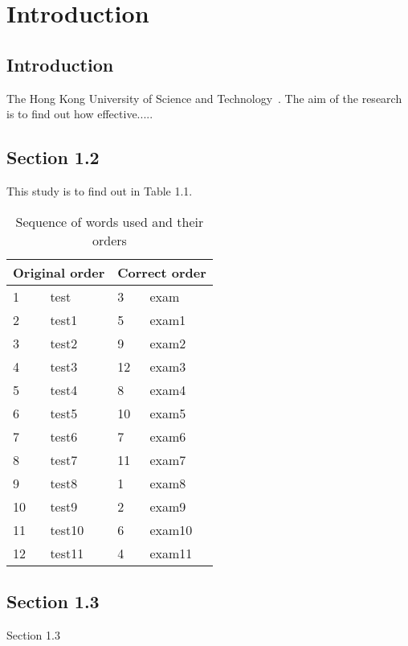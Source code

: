 \chapter{Introduction}

\section{Introduction}

The Hong Kong University of Science and Technology~\cite{C. D. Mee}.
The aim of the research~\cite{S. Tehrani} is to find out how
effective.....

\section{Section 1.2}

This study is to find out in Table 1.1.
\begin{table}[ht]
\begin{center}
\begin{tabular}{|l|l||l|l|}
\hline
\multicolumn{2}{|c||}{Original order} & \multicolumn{2}{c|}{Correct order} \\ \hline
1 & test & 3 & exam \\
2 & test1 & 5 & exam1 \\
3 & test2 & 9 & exam2 \\
4 & test3 & 12 & exam3 \\
5 & test4 & 8 & exam4 \\
6 & test5 & 10 & exam5 \\
7 & test6 & 7 & exam6 \\
8 & test7 & 11 & exam7 \\
9 & test8 & 1 & exam8 \\
10 & test9 & 2 & exam9 \\
11 & test10 & 6 & exam10 \\
12 & test11 & 4 & exam11 \\ \hline
\end{tabular}
\caption{Sequence of words used and their orders}
\end{center}
\end{table}

\section{Section 1.3}

Section 1.3
